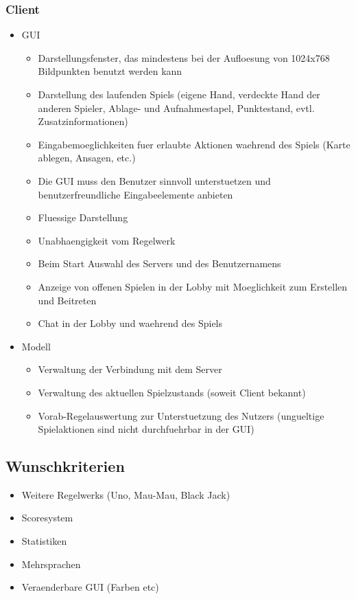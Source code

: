 \documentclass{article}
\begin{document}
\subsubsection{\gls{Client}}
\begin{itemize}
	\item GUI
	\begin{itemize}
		\item Darstellungsfenster, das mindestens bei der Aufloesung von 1024x768 Bildpunkten benutzt werden kann
		\item Darstellung des laufenden Spiels (eigene Hand, verdeckte Hand der anderen Spieler, Ablage- und Aufnahmestapel, 			Punktestand, evtl. Zusatzinformationen)
		\item Eingabemoeglichkeiten fuer erlaubte Aktionen waehrend des Spiels (Karte ablegen, Ansagen, etc.)
		\item Die \gls{GUI} muss den Benutzer sinnvoll unterstuetzen und benutzerfreundliche Eingabeelemente anbieten
		\item Fluessige Darstellung
		\item Unabhaengigkeit vom \gls{Regelwerk}
		\item Beim Start Auswahl des \gls{Server}s und des Benutzernamens
		\item Anzeige von offenen Spielen in der \gls{Lobby} mit Moeglichkeit zum Erstellen und Beitreten
		\item Chat in der \gls{Lobby} und waehrend des Spiels
	\end{itemize}
	\item Modell
	\begin{itemize}
		\item Verwaltung der Verbindung mit dem \gls{Server}
		\item Verwaltung des aktuellen Spielzustands (soweit \gls{Client} bekannt)
		\item Vorab-Regelauswertung zur Unterstuetzung des Nutzers (ungueltige Spielaktionen sind nicht durchfuehrbar in der 					\gls{GUI})
	\end{itemize}
\end{itemize}

\subsection{Wunschkriterien}
\begin{itemize}
	\item Weitere \glspl{Regelwerk} (Uno, Mau-Mau, Black Jack)
	\item Scoresystem
	\item Statistiken
	\item Mehrsprachen
	\item Veraenderbare \gls{GUI} (Farben etc)
\end{itemize}
\end{document}
